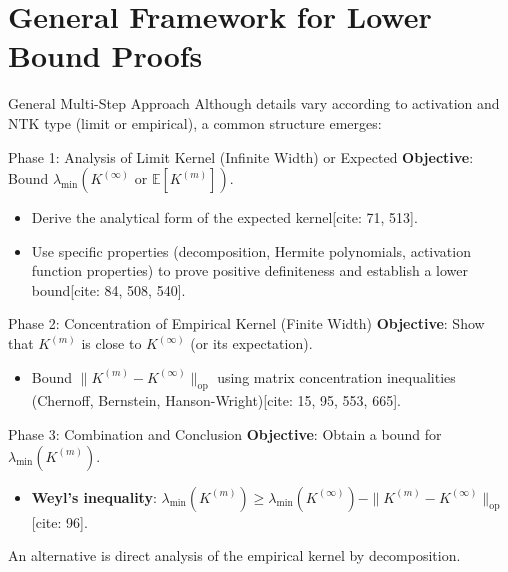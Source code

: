 \documentclass{beamer}
\theoremstyle{definition}
\theoremstyle{remark}
\newcommand{\E}{\mathbb{E}}
\newcommand{\lambdaMin}{\lambda_{\min}}
\begin{document}
\section{General Framework for Lower Bound Proofs}
\begin{frame}{General Multi-Step Approach}
  \justify
  Although details vary according to activation and NTK type (limit or empirical), a common structure emerges:

  \begin{block}{Phase 1: Analysis of Limit Kernel (Infinite Width) or Expected}
    \textbf{Objective}: Bound $\lambdaMin(K^{(\infty)} \text{ or } \E[K^{(m)}])$.
    \begin{itemize}
      \item Derive the analytical form of the expected kernel[cite: 71, 513].
      \item Use specific properties (decomposition, Hermite polynomials, activation function properties) to prove positive definiteness and establish a lower bound[cite: 84, 508, 540].
    \end{itemize}
  \end{block}
  \pause
  \begin{block}{Phase 2: Concentration of Empirical Kernel (Finite Width)}
    \textbf{Objective}: Show that $K^{(m)}$ is close to $K^{(\infty)}$ (or its expectation).
    \begin{itemize}
      \item Bound $\|K^{(m)} - K^{(\infty)}\|_{\text{op}}$ using matrix concentration inequalities (Chernoff, Bernstein, Hanson-Wright)[cite: 15, 95, 553, 665].
    \end{itemize}
  \end{block}
  \pause
  \begin{block}{Phase 3: Combination and Conclusion}
    \textbf{Objective}: Obtain a bound for $\lambdaMin(K^{(m)})$.
    \begin{itemize}
      \item \textbf{Weyl's inequality}: $\lambdaMin(K^{(m)}) \ge \lambdaMin(K^{(\infty)}) - \|K^{(m)} - K^{(\infty)}\|_{\text{op}}$[cite: 96].
    \end{itemize}
  \end{block}
  An alternative is direct analysis of the empirical kernel by decomposition.
\end{frame}

\end{document}

